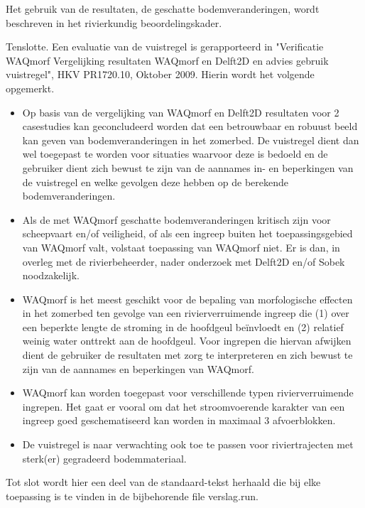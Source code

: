 Het gebruik van de resultaten, de geschatte bodemveranderingen, wordt beschreven in het rivierkundig beoordelingskader.

Tenslotte. Een evaluatie van de vuistregel is gerapporteerd in "Verificatie WAQmorf Vergelijking resultaten WAQmorf en Delft2D en advies gebruik vuistregel", HKV PR1720.10, Oktober 2009.
Hierin wordt het volgende opgemerkt.

\begin{itemize}

\item Op basis van de vergelijking van WAQmorf en Delft2D resultaten voor 2 casestudies kan geconcludeerd worden dat \dfastmi een betrouwbaar en robuust beeld kan geven van bodemveranderingen in het zomerbed.
De vuistregel dient dan wel toegepast te worden voor situaties waarvoor deze is bedoeld en de gebruiker dient zich bewust te zijn van de aannames in- en beperkingen van de vuistregel en welke gevolgen deze hebben op de berekende bodemveranderingen.

\item Als de met WAQmorf geschatte bodemveranderingen kritisch zijn voor scheepvaart en/of veiligheid, of als een ingreep buiten het toepassingsgebied van WAQmorf valt, volstaat toepassing van WAQmorf niet.
Er is dan, in overleg met de rivierbeheerder, nader onderzoek met Delft2D en/of Sobek noodzakelijk.

\item WAQmorf is het meest geschikt voor de bepaling van morfologische effecten in het zomerbed ten gevolge van een rivierverruimende ingreep die (1) over een beperkte lengte de stroming in de hoofdgeul be\"invloedt en (2) relatief weinig water onttrekt aan de hoofdgeul.
Voor ingrepen die hiervan afwijken dient de gebruiker de resultaten met zorg te interpreteren en zich bewust te zijn van de aannames en beperkingen van WAQmorf.

\item WAQmorf kan worden toegepast voor verschillende typen rivierverruimende ingrepen.
Het gaat er vooral om dat het stroomvoerende karakter van een ingreep goed geschematiseerd kan worden in maximaal 3 afvoerblokken.

\item De vuistregel is naar verwachting ook toe te passen voor riviertrajecten met sterk(er) gegradeerd bodemmateriaal.
\end{itemize}

Tot slot wordt hier een deel van de standaard-tekst herhaald die bij elke toepassing is te vinden in de bijbehorende file verslag.run.

